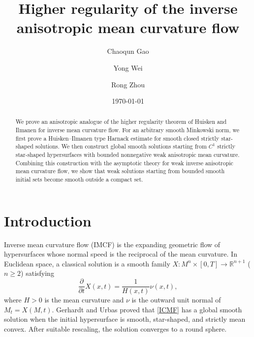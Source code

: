 \documentclass[11pt,reqno]{amsart}
\theoremstyle{definition}
\theoremstyle{remark}
\numberwithin{equation}{section}
\begin{document}
\title[Higher regularity of the inverse anisotropic mean curvature flow]{Higher regularity of the inverse anisotropic mean curvature flow}

\author[C. Gao]{Chaoqun Gao}
\author[Y. Wei]{Yong Wei}
\author[R. Zhou]{Rong Zhou}

\address{School of Mathematical Sciences, University of Science and Technology of China, Hefei 230026, P.R. China}

\date{\today}
	
		\begin{abstract}
		We prove an anisotropic analogue of the higher regularity theorem of Huisken and Ilmanen for inverse mean curvature flow. For an arbitrary smooth Minkowski norm, we first prove a Huisken--Ilmanen type Harnack estimate for smooth closed strictly star-shaped solutions. We then construct global smooth solutions starting from $C^1$ strictly star-shaped hypersurfaces with bounded nonnegative weak anisotropic mean curvature. Combining this construction with the asymptotic theory for weak inverse anisotropic mean curvature flow, we show that weak solutions starting from bounded smooth initial sets become smooth outside a compact set.
	\end{abstract}
	
	\maketitle
	\tableofcontents
	
	
	\section{Introduction}
	\label{section1}
	Inverse mean curvature flow (IMCF) is the expanding geometric flow of hypersurfaces whose normal speed is the reciprocal of the mean curvature. In Euclidean space, a classical solution is a smooth family $X:M^n\times[0,T]\to \mathbb{R}^{n+1}$ ($n\geq 2$) satisfying
	\begin{equation}
		\label{ICMF}
		\frac{\partial }{\partial t}X(x,t)=\frac{1}{H(x,t)}\nu(x,t), 
	\end{equation}
	where $H>0$ is the mean curvature and $\nu$ is the outward unit normal of $M_t=X(M,t)$. Gerhardt \cite{G90} and Urbas \cite{U90} proved that \eqref{ICMF} has a global smooth solution when the initial hypersurface is smooth, star-shaped, and strictly mean convex. After suitable rescaling, the solution converges to a round sphere.
	
\end{document}
